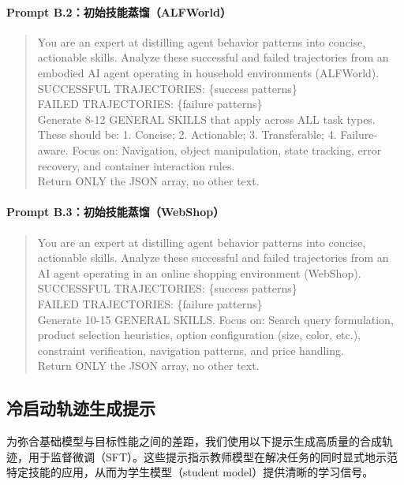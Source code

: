 \documentclass[11pt,UTF8,fontset=fandol]{ctexart}
\begin{document}
\paragraph{Prompt B.2：初始技能蒸馏（ALFWorld）}
\begin{quote}\small\ttfamily
You are an expert at distilling agent behavior patterns into concise, actionable skills. Analyze these successful and failed trajectories from an embodied AI agent operating in household environments (ALFWorld).\\[0.3em]
SUCCESSFUL TRAJECTORIES: \{success patterns\}\\
FAILED TRAJECTORIES: \{failure patterns\}\\[0.3em]
Generate 8-12 GENERAL SKILLS that apply across ALL task types. These should be: 1. Concise; 2. Actionable; 3. Transferable; 4. Failure-aware. Focus on: Navigation, object manipulation, state tracking, error recovery, and container interaction rules.\\[0.3em]
Return ONLY the JSON array, no other text.
\end{quote}

\paragraph{Prompt B.3：初始技能蒸馏（WebShop）}
\begin{quote}\small\ttfamily
You are an expert at distilling agent behavior patterns into concise, actionable skills. Analyze these successful and failed trajectories from an AI agent operating in an online shopping environment (WebShop).\\[0.3em]
SUCCESSFUL TRAJECTORIES: \{success patterns\}\\
FAILED TRAJECTORIES: \{failure patterns\}\\[0.3em]
Generate 10-15 GENERAL SKILLS. Focus on: Search query formulation, product selection heuristics, option configuration (size, color, etc.), constraint verification, navigation patterns, and price handling.\\[0.3em]
Return ONLY the JSON array, no other text.
\end{quote}

\subsection{冷启动轨迹生成提示}

为弥合基础模型与目标性能之间的差距，我们使用以下提示生成高质量的合成轨迹，用于监督微调（SFT）。这些提示指示教师模型在解决任务的同时显式地示范特定技能的应用，从而为学生模型（student model）提供清晰的学习信号。
\end{document}
